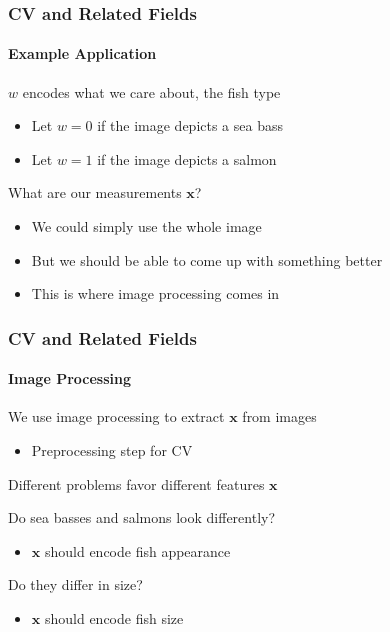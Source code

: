\documentclass[xetex,professionalfont]{beamer}
\renewcommand{\vec}[1]{\ensuremath{\mathbf{#1}}}
\newcommand{\vx}{\vec{x}}
\renewcommand\emph[1]{\textcolor{tuwcvl_inf_red}{#1}}
\begin{document}

\begin{frame}
\frametitle{CV and Related Fields}
\framesubtitle{Example Application}

$w$ encodes what we care about, the fish type
\begin{itemize}
    \item Let $w=0$ if the image depicts a sea bass
    \item Let $w=1$ if the image depicts a salmon
\end{itemize}

\bigskip
What are our measurements $\vx$?
\begin{itemize}
    \item We could simply use the whole image
    \item But we should be able to come up with something better
    \item This is where image processing comes in
\end{itemize}

\end{frame}


\begin{frame}
\frametitle{CV and Related Fields}
\framesubtitle{Image Processing}

We use \emph{image processing} to extract $\vx$ from images
\begin{itemize}
    \item Preprocessing step for CV
\end{itemize}

\bigskip
Different problems favor different features $\vx$

\bigskip
Do sea basses and salmons look differently?
\begin{itemize}
    \item $\vx$ should encode fish appearance
\end{itemize}

\bigskip
Do they differ in size?
\begin{itemize}
    \item $\vx$ should encode fish size
\end{itemize}

\end{frame}

\end{document}
